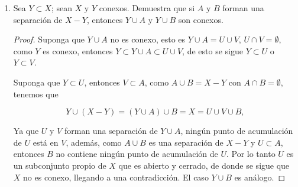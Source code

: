 \documentclass[12bpt]{article}
\begin{document}
\begin{enumerate}
\begin{proof}
  lo que contradice el hecho de que $Y$ es conexo. 
    \end{proof}

    \item Sea $Y \subset X$; sean $X$  y $Y$ conexos. Demuestra que si $A$ y $B$ forman una separación de $X - Y$, entonces $Y \cup A$ y $Y \cup B$ son conexos.

    \begin{proof}
        Suponga que $Y\cup A$ no es conexo, esto es $Y\cup A=U\cup V$, $U\cap V=\emptyset$, como $Y$ es conexo, entonces $Y\subset Y\cup A\subset U\cup V $, de esto se sigue $Y\subset U$ o $Y\subset V$.

        Suponga que $Y\subset U$, entonces $V\subset A$, como $A\cup B=X-Y$ con $A\cap B=\emptyset$, tenemos que 

        $$Y\cup (X-Y)=(Y\cup A)\cup B=X=U\cup V\cup B,$$

        Ya que $U$ y $V$ forman una separación de $Y \cup A$, ningún punto de acumulación de $U$ está en $V$, además, como $A \cup B$ es una separación de $X-Y$ y $U \subset A$, entonces $B$ no contiene ningún punto de acumulación de $U$. Por lo tanto $U$ es un subconjunto propio de $X$ que es abierto y cerrado, de donde se sigue que $X$ no es conexo, llegando a una contradicción. El caso $Y \cup B$ es análogo.  
    \end{proof}

\end{enumerate}
\end{document}
